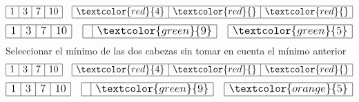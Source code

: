 \documentclass{article}
\begin{document}
\begin{minipage}{0.5\textwidth}
\begin{equation*}
    \large
    \begin{array}{|r|r|r|r|}
      \hline 1 & 3 & 7 & 10 \\ \hline
    \end{array}\quad 
    \begin{array}{|r|r|r|}
      \hline \textcolor{red}{4} & \textcolor{red}{} & \textcolor{red}{} \\ \hline
    \end{array}
  \end{equation*}
  \begin{equation*}
    \large
    \begin{array}{|r|r|r|r|}
      \hline 1 & 3 & 7 & 10 \\ \hline
    \end{array}\quad 
    \begin{array}{|r|r|}
      \hline & \textcolor{green}{9} \\ \hline
    \end{array} \quad
    \begin{array}{|r|}
      \hline \textcolor{green}{5} \\ \hline
    \end{array}
  \end{equation*}
  Seleccionar el mínimo de las dos cabezas sin tomar en cuenta el mínimo anterior
  \begin{equation*}
    \large
    \begin{array}{|r|r|r|r|}
      \hline 1 & 3 & 7 & 10 \\ \hline
    \end{array}\quad 
    \begin{array}{|r|r|r|}
      \hline \textcolor{red}{4} & \textcolor{red}{} & \textcolor{red}{} \\ \hline
    \end{array}
  \end{equation*}
  \begin{equation*}
    \large
    \begin{array}{|r|r|r|r|}
      \hline 1 & 3 & 7 & 10 \\ \hline
    \end{array}\quad 
    \begin{array}{|r|r|}
      \hline & \textcolor{green}{9} \\ \hline
    \end{array} \quad
    \begin{array}{|r|}
      \hline \textcolor{orange}{5} \\ \hline
    \end{array}

\end{equation*}
\end{minipage}
\end{document}
